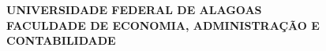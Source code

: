 \documentclass[12pt,a4paper]{article}
\begin{document}
	
	\begin{titlepage}
		\centering
		\large
		\textbf{UNIVERSIDADE FEDERAL DE ALAGOAS} \\
		\textbf{FACULDADE DE ECONOMIA, ADMINISTRAÇÃO E CONTABILIDADE } \\
		\vfill
	\end{titlepage}
	
	
\end{document}
